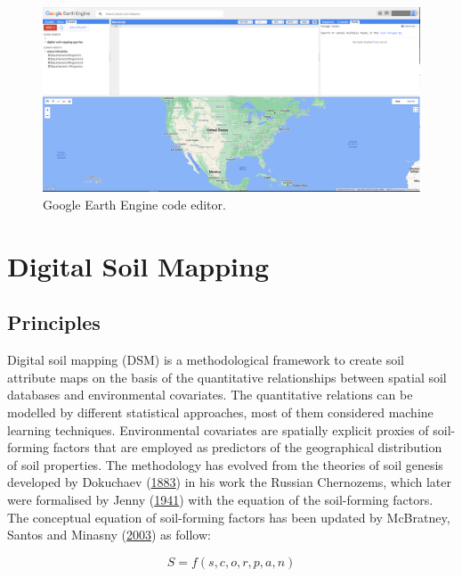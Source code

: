 \documentclass[
  10pt,
  b5paper,
  oneside]{book}
\begin{document}
\begin{figure}
\includegraphics[width=1\linewidth]{images/2.1_GEE_codeeditor} \caption{Google Earth Engine code editor.}\label{fig:GEE2}
\end{figure}

\hypertarget{digital-soil-mapping}{%
\chapter{Digital Soil Mapping}\label{digital-soil-mapping}}

\hypertarget{principles}{%
\section{Principles}\label{principles}}

Digital soil mapping (DSM) is a methodological framework to create soil attribute maps on the basis of the quantitative relationships between spatial soil databases and environmental covariates. The quantitative relations can be modelled by different statistical approaches, most of them considered machine learning techniques. Environmental covariates are spatially explicit proxies of soil-forming factors that are employed as predictors of the geographical distribution of soil properties. The methodology has evolved from the theories of soil genesis developed by Dokuchaev (\protect\hyperlink{ref-Dokuchaev1883}{1883}) in his work the Russian Chernozems, which later were formalised by Jenny (\protect\hyperlink{ref-Jenny1941}{1941}) with the equation of the soil-forming factors. The conceptual equation of soil-forming factors has been updated by McBratney, Santos and Minasny (\protect\hyperlink{ref-McBratney2003}{2003}) as follow:

\begin{equation} 
  S = f\left(s,c,o,r,p,a,n\right)
  \label{eq:scorpan}
\end{equation}
\end{document}
